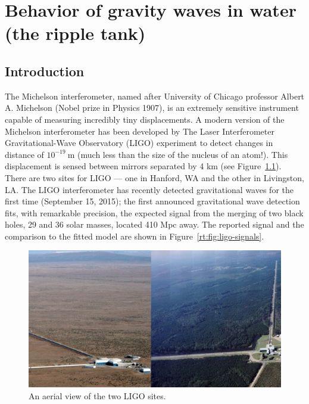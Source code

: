 \chapter{Behavior of gravity waves in water (the ripple tank)}\label{cha:ripple-tank}


\section{Introduction}

The Michelson interferometer, named after University of Chicago professor Albert A. Michelson (Nobel prize in Physics 1907), is an extremely sensitive instrument capable of measuring incredibly tiny displacements.
A modern version of the Michelson interferometer has been developed by The Laser Interferometer Gravitational-Wave Observatory (LIGO) experiment to detect changes in distance of $10^{-19}\:$m (much less than the size of the nucleus of an atom!).
This displacement is sensed between mirrors separated by 4 km (see Figure~\ref{rt:fig:ligo-aerial}). There are two sites for LIGO --- one in Hanford, WA and the other in Livingston, LA.
The LIGO interferometer has recently detected gravitational waves for the first time (September 15, 2015); the first announced gravitational wave detection fits, with remarkable precision, the expected signal from the merging of two black holes, 29 and 36 solar masses, located 410 Mpc away.
The reported signal and the comparison to the fitted model are shown in Figure~\ref{rt:fig:ligo-signals}.

\begin{figure}
	\includegraphics[width=\textwidth]{ripple-tank/ligo-aerial.png}
	\caption{An aerial view of the two LIGO sites.}\label{rt:fig:ligo-aerial}
\end{figure}

